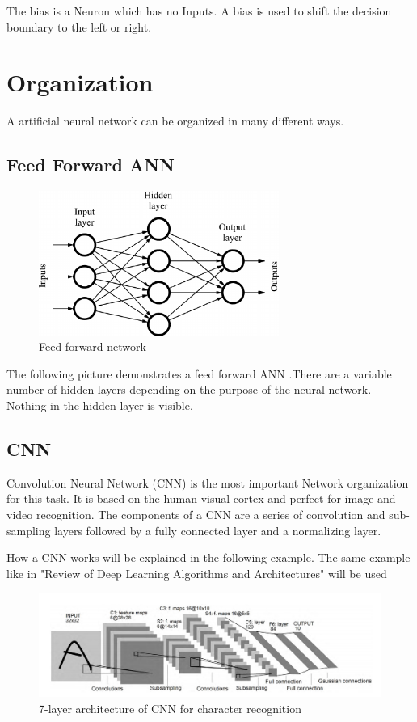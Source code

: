 The bias is a Neuron which has no Inputs. A bias is used to shift the decision boundary to the left or right.

\section{Organization}

A artificial neural network can be organized in many different ways.

\subsection{Feed Forward ANN}

\begin{figure}[h]
	\centering
	\includegraphics[width=0.7\textwidth]{./media/images/feed_forward_neural_network.png}
  	\caption{Feed forward network}
  	\label{ffNN}
\end{figure}

The following picture demonstrates a feed forward ANN .There are a variable number of hidden layers depending on the purpose of the neural network. Nothing in the hidden layer is visible. 

\subsection{CNN}

Convolution Neural Network (CNN) is the most important Network organization for this task. It is based on the human visual cortex and perfect for image and video recognition. The components of a CNN are a series of convolution and sub-sampling layers followed by a fully connected layer and a normalizing layer.

How a CNN works will be explained in the following example. The same example like in "Review of Deep Learning Algorithms and Architectures"\cite{networks,exampleCNN} will be used
\begin{figure}[h]
	\centering
	\includegraphics[width=1.1\textwidth]{./media/images/CNN.PNG}
  	\caption{7-layer architecture of CNN for character recognition
  	\\ \cite[Fig.~4.]{networks,exampleCNN}}
  	\label{CNN}
\end{figure}

